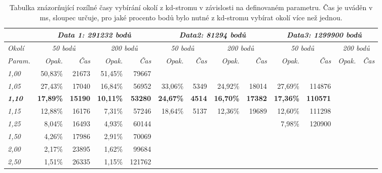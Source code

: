 \documentclass[11pt,twoside,a4paper]{book}
\begin{document}
\begin{table}[ht]
\resizebox{\textwidth}{!} {
\begin{tabular}{|l|r|r|r|r|l|l|l|l|r|l|l|l|}
\hline
\textit{} & \multicolumn{ 4}{c|}{\textit{Data 1: 291232 bodů}} & \multicolumn{ 4}{c|}{\textit{Data2: 81294 bodů}} & \multicolumn{ 4}{c|}{\textit{Data3: 1299900 bodů}} \\ \hline
\textit{Okolí} & \multicolumn{ 2}{c|}{\textit{50 bodů}} & \multicolumn{ 2}{c|}{\textit{200 bodů}} & \multicolumn{ 2}{c|}{\textit{50 bodů}} & \multicolumn{ 2}{c|}{\textit{200 bodů}} & \multicolumn{ 2}{c|}{\textit{50 bodů}} & \multicolumn{ 2}{c|}{\textit{200 bodů}} \\ \hline
\textit{Param.} & \textit{Opak.} & \textit{Čas} & \textit{Opak.} & \textit{Čas} & \multicolumn{1}{r|}{\textit{Opak.}} & \multicolumn{1}{r|}{\textit{Čas}} & \multicolumn{1}{r|}{\textit{Opak.}} & \multicolumn{1}{r|}{\textit{Čas}} & \textit{Opak.} & \multicolumn{1}{r|}{\textit{Čas}} & \multicolumn{1}{r|}{\textit{Opak.}} & \multicolumn{1}{r|}{\textit{Čas}} \\ \hline
\textit{1,00} & 50,83\% & 21673 & 51,45\% & 79667 &  &  &  &  & \multicolumn{1}{l|}{} &  &  &  \\ \hline
\textit{1,05} & 27,43\% & 17040 & 16,84\% & 56952 & \multicolumn{1}{r|}{33,06\%} & \multicolumn{1}{r|}{5349} & \multicolumn{1}{r|}{24,92\%} & \multicolumn{1}{r|}{18014} & 27,69\% & \multicolumn{1}{r|}{114876} &  &  \\ \hline
\textbf{\textit{1,10}} & \textbf{17,89\%} & \textbf{15190} & \textbf{10,11\%} & \textbf{53280} & \multicolumn{1}{r|}{\textbf{24,67\%}} & \multicolumn{1}{r|}{\textbf{4514}} & \multicolumn{1}{r|}{\textbf{16,70\%}} & \multicolumn{1}{r|}{\textbf{17382}} & \textbf{17,36\%} & \multicolumn{1}{r|}{\textbf{110571}} & \textbf{} & \textbf{} \\ \hline
\textit{1,15} & 12,88\% & 16176 & 7,31\% & 57246 & \multicolumn{1}{r|}{18,64\%} & \multicolumn{1}{r|}{5137} & \multicolumn{1}{r|}{12,36\%} & \multicolumn{1}{r|}{19689} & 12,60\% & \multicolumn{1}{r|}{111298} &  &  \\ \hline
\textit{1,25} & 8,04\% & 16493 & 4,93\% & 60144 &  &  &  &  & 7,98\% & \multicolumn{1}{r|}{120900} &  &  \\ \hline
\textit{1,50} & 4,26\% & 17986 & 2,91\% & 70069 &  &  &  &  & \multicolumn{1}{l|}{} &  &  &  \\ \hline
\textit{2,00} & 2,17\% & 23895 & 1,62\% & 99684 &  &  &  &  & \multicolumn{1}{l|}{} &  &  &  \\ \hline
\textit{2,50} & 1,51\% & 26335 & 1,15\% & 121762 &  &  &  &  & \multicolumn{1}{l|}{} &  &  &  \\ \hline
\end{tabular}
}
\caption{Tabulka znázorňující rozílné časy vybírání okolí z kd-stromu v závislosti na definovaném parametru. Čas je uváděn v ms, sloupec  určuje, pro jaké procento bodů bylo nutné z kd-stromu vybírat okolí více než jednou.} 
\label{table:okoli-param}
\end{table}
\end{document}
